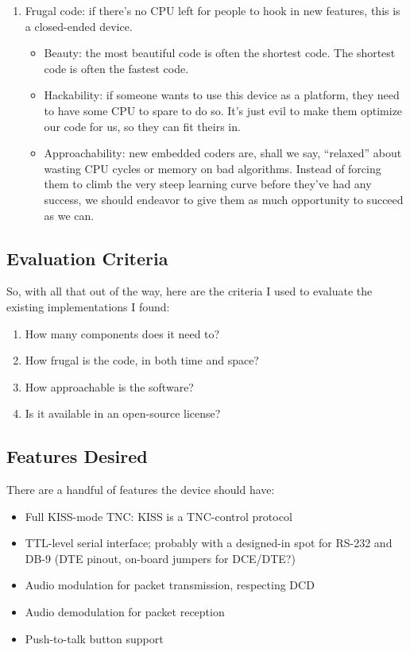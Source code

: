 \documentclass{article}
\begin{document}
\begin{enumerate}
\item Frugal code: if there's no CPU left for people to hook in new
  features, this is a closed-ended device.
\begin{itemize}
\item Beauty: the most beautiful code is often the shortest code.  The
  shortest code is often the fastest code.
\item Hackability: if someone wants to use this device as a platform,
  they need to have some CPU to spare to do so.  It's just evil to
  make them optimize our code for us, so they can fit theirs in.
\item Approachability: new embedded coders are, shall we say,
  ``relaxed'' about wasting CPU cycles or memory on bad
  algorithms.  Instead of forcing them to climb the very steep
  learning curve before they've had any success, we should endeavor to
  give them as much opportunity to succeed as we can.
\end{itemize}

\end{enumerate}


\subsection{Evaluation Criteria}

So, with all that out of the way, here are the criteria I used to
evaluate the existing implementations I found:
\begin{enumerate}
\item \label{criteria:components} How many components does it need to?
\item \label{criteria:frugality} How frugal is the code, in both time
  and space?
\item \label{criteria:approachability} How approachable is the software?
\item \label{criteria:license} Is it available in an open-source license?
\end{enumerate}


\subsection{Features Desired}

There are a handful of features the device should have:

\begin{itemize}
\item Full KISS-mode TNC: KISS is a TNC-control protocol\cite{KISS}
\item TTL-level serial interface; probably with a designed-in spot for
  RS-232 and DB-9 (DTE pinout, on-board jumpers for DCE/DTE?)
\item Audio modulation for packet transmission, respecting DCD
\item Audio demodulation for packet reception
\item Push-to-talk button support
\end{itemize}
\end{document}
